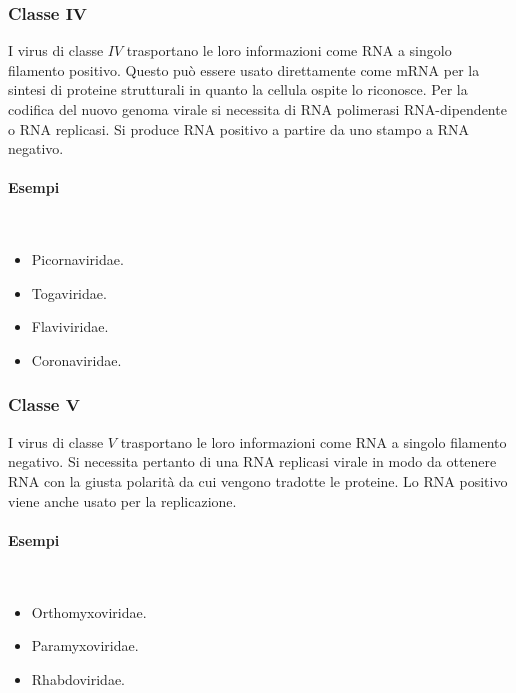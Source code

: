 		\subsubsection{Classe $\mathbf{IV}$}
		I virus di classe $IV$ trasportano le loro informazioni come RNA a singolo filamento positivo.
		Questo pu\`o essere usato direttamente come mRNA per la sintesi di proteine strutturali in quanto la cellula ospite lo riconosce.
		Per la codifica del nuovo genoma virale si necessita di RNA polimerasi RNA-dipendente o RNA replicasi.
		Si produce RNA positivo a partire da uno stampo a RNA negativo.
		
			\paragraph{Esempi}\mbox{}\\
			\begin{multicols}{2}
				\begin{itemize}
					\item Picornaviridae.
					\item Togaviridae.
					\item Flaviviridae.
					\item Coronaviridae.
				\end{itemize}
			\end{multicols}

		\subsubsection{Classe $\mathbf{V}$}
		I virus di classe $V$ trasportano le loro informazioni come RNA a singolo filamento negativo.
		Si necessita pertanto di una RNA replicasi virale in modo da ottenere RNA con la giusta polarit\`a da cui vengono tradotte le proteine.
		Lo RNA positivo viene anche usato per la replicazione.

			\paragraph{Esempi}\mbox{}\\
			\begin{multicols}{3}
				\begin{itemize}
					\item Orthomyxoviridae.
					\item Paramyxoviridae.
					\item Rhabdoviridae.
				\end{itemize}
			\end{multicols}


